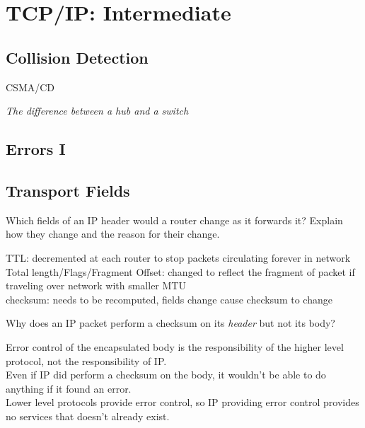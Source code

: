 \chapter{TCP/IP: Intermediate}




\section{Collision Detection}


CSMA/CD


\frmrule

\textit{The difference between a hub and a switch}





\section{Errors I}


\frmrule


\section{Transport Fields}

\begin{example}
Which fields of an IP header would a router change as it forwards it? 
Explain how they change and the reason for their change.

TTL: decremented at each router to stop packets circulating forever in network\\
Total length/Flags/Fragment Offset: changed to reflect the fragment of packet 
if traveling over network with smaller MTU\\
checksum: needs to be recomputed, fields change cause checksum to change
\end{example}

\frmrule

\begin{example}
Why does an IP packet perform a checksum on its \textit{header} but not its body?

Error control of the encapsulated body is the responsibility of the higher level protocol, 
not the responsibility of IP. \\
Even if IP did perform a checksum on the body, it wouldn't be able to do anything 
if it found an error. \\
Lower level protocols provide error control, 
so IP providing error control provides no services that doesn't already exist.
\end{example}



